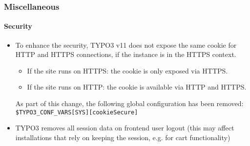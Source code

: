 %

\begin{frame}[fragile]
	\frametitle{Miscellaneous}
	\framesubtitle{Security}

	\begin{itemize}
		\item To enhance the security, TYPO3 v11 does not expose the same cookie
			for HTTP and HTTPS connections, if the instance is in the HTTPS context.

			\begin{itemize}
				\item If the site runs on HTTPS: the cookie is only exposed via HTTPS.
				\item If the site runs on HTTP: the cookie is available via HTTP and HTTPS.
			\end{itemize}

			As part of this change, the following global configuration has been removed:
		 	\smaller\texttt{\$TYPO3\_CONF\_VARS[SYS][cookieSecure]}\normalsize

		\item TYPO3 removes all session data on frontend user logout\newline
			\small(this may affect installations that rely on keeping the session, e.g. for cart functionality)\normalsize

	\end{itemize}

\end{frame}


